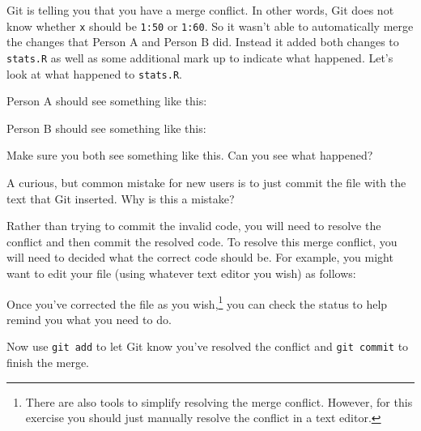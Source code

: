\documentclass{article}
\begin{document}
\begin{enumerate}
\begin{enumerate}
\begin{itemize}
Git is telling you that you have a merge conflict.  In other words, Git does
not know whether \texttt{x} should be \texttt{1:50} or \texttt{1:60}. So it
wasn't able to automatically merge the changes that Person A and Person B did.
Instead it added both changes to \texttt{stats.R} as well as some additional
mark up to indicate what happened. Let's look at what happened to
\texttt{stats.R}.

Person A should see something like this:
%
%

Person B should see something like this:
%
%

Make sure you both see something like this. Can you see what happened?

A curious, but common mistake for new users is to just commit the file with the
text that Git inserted.  Why is this a mistake?

Rather than trying to commit the invalid code, you will need to resolve the
conflict and then commit the resolved code.  To resolve this merge conflict,
you will need to decided what the correct code should be.  For example, you
might want to edit your file (using whatever text editor you wish) as
follows:

%
%

Once you've corrected the file as you wish,\footnote{There are also tools to
simplify resolving the merge conflict.  However, for this exercise you should
just manually resolve the conflict in a text editor.} you can check the status
to help remind you what you need to do.

%
%
%
%

Now use \texttt{git add} to let Git know you've resolved the conflict
and \texttt{git commit} to finish the merge.


\end{itemize}
\end{enumerate}
\end{enumerate}
\end{document}
